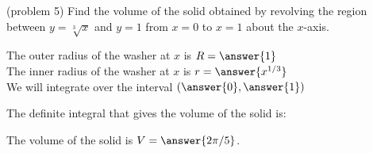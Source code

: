 \documentclass{ximera}
\begin{document}
\begin{problem}(problem 5)
Find the volume of the solid obtained by revolving the region between $y= \sqrt[3] x$ and $y = 1$ from $x = 0$ to $x = 1$ about the $x$-axis.


The outer radius of the washer at $x$ is $R = \answer{1}$\\
The inner radius of the washer at $x$ is $r = \answer{x^{1/3}}$\\

We will integrate over the interval $\left(\answer{0},\answer{1}\right)$

The definite integral that gives the volume of the solid is:\\
\begin{multipleChoice}
\end{multipleChoice}

The volume of the solid is $V = \answer{2\pi/5 }$.

\end{problem}
\end{document}
